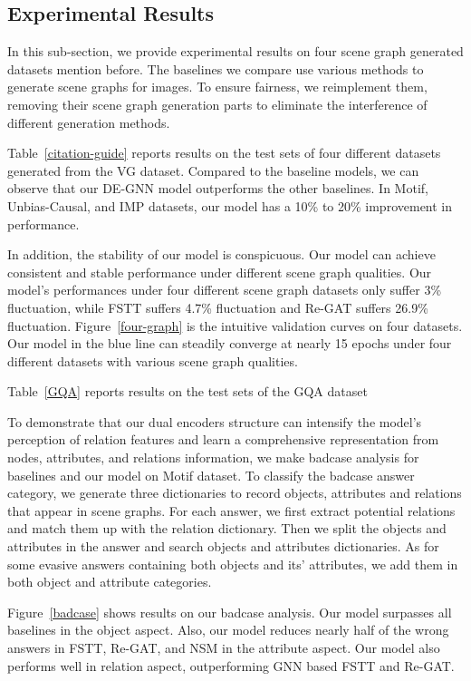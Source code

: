 \documentclass[letterpaper]{article} %
\begin{document}
\subsection{Experimental Results}
In this sub-section, we provide experimental results on four scene graph generated datasets mention before. The baselines we compare  use various methods to generate scene graphs for images. To ensure fairness, we reimplement them, removing their scene graph generation parts to eliminate the interference of different generation methods.

Table~\ref{citation-guide} reports results on the test sets of four different datasets generated from the VG dataset. Compared to the baseline models, we can observe that our DE-GNN model outperforms the other baselines. In Motif, Unbias-Causal, and IMP datasets, our model has a 10\% to 20\% improvement in performance.

In addition, the stability of our model is conspicuous. Our model can achieve consistent and stable performance under different scene graph qualities. Our model's performances under four different scene graph datasets only suffer 3\% fluctuation,
while FSTT suffers 4.7\% fluctuation and Re-GAT suffers 26.9\% fluctuation. Figure~\ref{four-graph} is the intuitive validation curves on four datasets. Our model in the blue line can steadily converge at nearly 15 epochs under four different datasets with various scene graph qualities. 

Table~\ref{GQA} reports results on the test sets of the GQA dataset

To demonstrate that our dual encoders structure can intensify the model's perception of relation features and learn a comprehensive representation from nodes, attributes, and relations information, we make badcase analysis for baselines and our model on Motif dataset. To classify the badcase answer category, we generate three dictionaries to record objects, attributes and relations that appear in scene graphs. For each answer, we first extract potential relations and match them up with the relation dictionary. Then we split the objects and attributes in the answer and search objects and attributes dictionaries. As for some evasive answers containing both objects and its' attributes, we add them in both object and attribute categories. 

Figure~\ref{badcase} shows results on our badcase analysis. Our model surpasses all baselines in the object aspect. Also, our model reduces nearly half of the wrong answers in FSTT, Re-GAT, and NSM in the attribute aspect. Our model also performs well in relation aspect, outperforming GNN based FSTT and Re-GAT.
\end{document}
